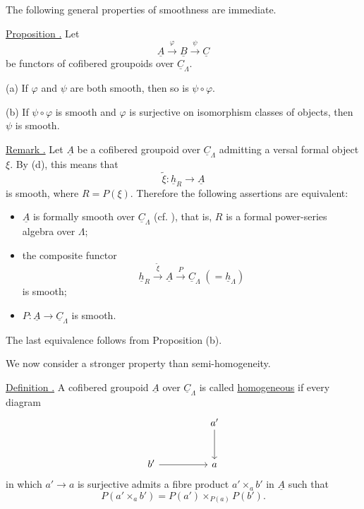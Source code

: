 The following general properties of smoothness are immediate.

\underline{Proposition .} Let
\[
 \underline A\xrightarrow{\ \varphi\ }\underline B
 \xrightarrow{\ \psi\ }\underline C
\]
be functors of cofibered groupoids over $\underline C_\Lambda$.

(a) If $\varphi$ and $\psi$ are both smooth, then so is
$\psi\circ\varphi$.

(b) If $\psi\circ\varphi$ is smooth and $\varphi$ is surjective on
isomorphism classes of objects, then $\psi$ is smooth.


\underline{Remark .} Let $\underline A$ be a cofibered groupoid
over $\underline C_\Lambda$ admitting a versal formal object $\xi$.
By (d), this means that
\[
 \widetilde\xi:\underline h_R\longrightarrow\underline A
\]
is smooth, where $R=P(\xi)$. Therefore the following assertions are
equivalent:

\begin{itemize}
\item $\underline A$ is formally smooth over $\underline C_\Lambda$
      (cf. ), that is, $R$ is a formal power-series algebra over
      $\Lambda$;
\item the composite functor
      \[
       \underline h_R\xrightarrow{\ \widetilde\xi\ }\underline A
       \xrightarrow{\ P\ }\underline C_\Lambda
       \;(=\underline h_\Lambda)
      \]
      is smooth;
\item $P:\underline A\longrightarrow\underline C_\Lambda$ is
      smooth.
\end{itemize}
The last equivalence follows from Proposition (b).

We now consider a stronger property than semi-homogeneity.

\underline{Definition .} A cofibered groupoid $\underline A$ over
$\underline C_\Lambda$ is called \underline{homogeneous} if every
diagram
\[
\begin{tikzcd}[row sep=large,column sep=huge]
 & a' \arrow[d]\\
 b' \arrow[r] & a
\end{tikzcd}
\]
in which $a'\longrightarrow a$ is surjective admits a fibre product
$a'\times_a b'$ in $\underline A$ such that
\[
 P(a'\times_a b')=
 P(a')\times_{P(a)}P(b').
\]

